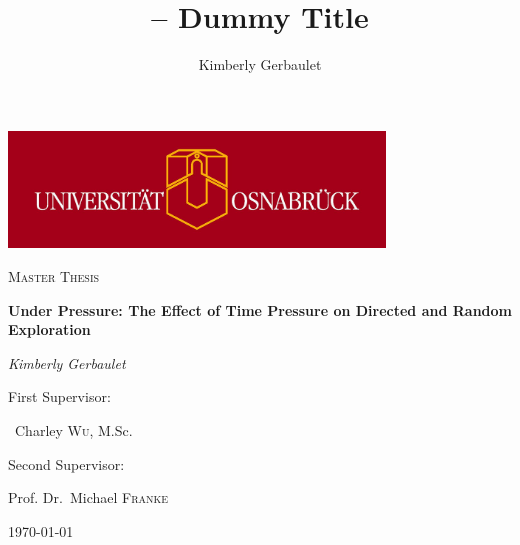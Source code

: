 \documentclass[main.tex]{subfiles}
\title{ -- Dummy Title}
\author{Kimberly Gerbaulet}
\date
\begin{document}
\begin{titlepage}
	\centering
	\includegraphics[width=0.75\textwidth]{UOS.jpg}\par\vspace{1.5cm}
	
	{\scshape\Large Master Thesis\par}
	\vspace{1.5cm}
	{\huge\bfseries Under Pressure: The Effect of Time Pressure on Directed and Random Exploration\par}
	\vspace{2cm}
	{\Large\itshape Kimberly Gerbaulet\par}
	\vfill
	First Supervisor:\par
    \vspace{0.2cm}
	~Charley \textsc{Wu}, M.Sc.\\
	    \vspace{0.5cm}

    Second Supervisor:\par 
        \vspace{0.2cm}

    Prof. Dr.~Michael \textsc{Franke}

	\vfill

	{\large \today\par}
\end{titlepage}
\fancyfoot{}
\fancyfoot[LE,RO]{\thepage}
\end{document}
